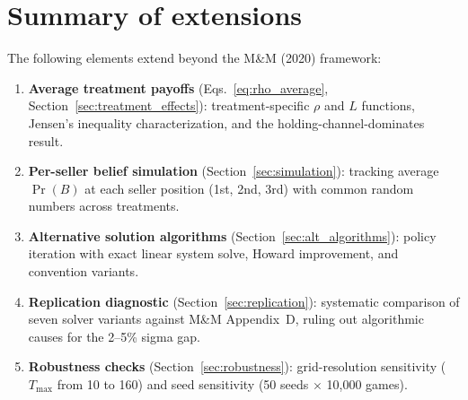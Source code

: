 \documentclass[11pt]{article}
\begin{document}
\section{Summary of extensions}

The following elements extend beyond the M\&M (2020) framework:

\begin{enumerate}
    \item \textbf{Average treatment payoffs}
    (Eqs.~\ref{eq:rho_average}, Section~\ref{sec:treatment_effects}):
    treatment-specific $\rho$ and $L$ functions, Jensen's inequality
    characterization, and the holding-channel-dominates result.

    \item \textbf{Per-seller belief simulation} (Section~\ref{sec:simulation}):
    tracking average $\Pr(B)$ at each seller position (1st, 2nd, 3rd) with
    common random numbers across treatments.

    \item \textbf{Alternative solution algorithms}
    (Section~\ref{sec:alt_algorithms}): policy iteration with exact linear
    system solve, Howard improvement, and convention variants.

    \item \textbf{Replication diagnostic} (Section~\ref{sec:replication}):
    systematic comparison of seven solver variants against M\&M Appendix~D,
    ruling out algorithmic causes for the 2--5\% sigma gap.

    \item \textbf{Robustness checks} (Section~\ref{sec:robustness}):
    grid-resolution sensitivity ($T_{\max}$ from 10 to 160) and seed
    sensitivity (50 seeds $\times$ 10{,}000 games).
\end{enumerate}
\end{document}

